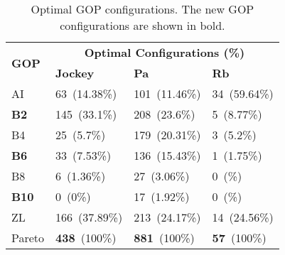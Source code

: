 \documentclass{book}
\begin{document}
\begin{table}[t!]
	\caption{Optimal GOP configurations. 
	              The new GOP configurations are shown in bold. \label{table:GOP}}
        \center
	\begin{tabular}{|l|lll|} %
		\hline
		\multirow{2}{*}{\textbf{GOP}} & \multicolumn{3}{c|}{\textbf{Optimal Configurations (\%)}}    \\ %
		\textbf{conf.} & \textbf{Jockey}  & \textbf{Pa} & \textbf{Rb}  \\ \hline \hline
		AI      & 63~(14.38\%) 	     & 101~(11.46\%)		& 34~(59.64\%)	\\ 
\textbf{B2}	   & 145~(33.1\%)   & 208~(23.6\%)		& 5~(8.77\%)		\\ 
		B4     & 25~(5.7\%)      & 179~(20.31\%)		& 3~(5.2\%)		\\ 
\textbf{B6}    & 33~(7.53\%) 	    & 136~(15.43\%)		& 1~(1.75\%)		\\ 
		B8     & 6~(1.36\%)  	    & 27~(3.06\%)			& 0~(\%)			\\ 
\textbf{B10}   & 0~(0\%)  		& 17~(1.92\%)			& 0~(\%)			\\ 
		ZL     & 166~(37.89\%)	& 213~(24.17\%)		& 14~(24.56\%)	\\ \hline
		Pareto & \textbf{438}~(100\%) & \textbf{881}~(100\%) & \textbf{57}~(100\%) \\ \hline
	\end{tabular}
\end{table}
\end{document}
